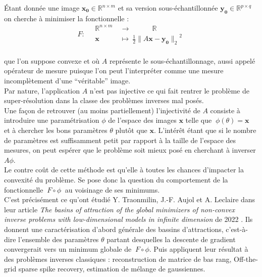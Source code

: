 \documentclass[hidelinks, french]{article} %
\newcommand{\R}{\mathbb{R}}
\newcommand{\lr}{\longrightarrow}
\renewcommand{\bf}[1]{\boldsymbol{#1}}
\theoremstyle{enonce}
\theoremstyle{special}
\theoremstyle{rq}
\theoremstyle{exo}
\theoremstyle{demo}
\begin{document}
Étant donnée une image $\bf{x_0}\in\R^{n\times m}$ et sa version sous-échantillonnée $\bf{y_0}\in\R^{p\times q}$ on cherche à minimiser la fonctionnelle :\begin{equation}\label{eq:F}
	F :\quad \begin{aligned}\R^{n\times m}\ &\lr\qquad\quad \R \\ \bf{x}\quad\ &\longmapsto\ \frac{1}{2}{\big\|A\bf{x}-\bf{y_0}\big\|_2}^2\end{aligned}\end{equation}
\\
que l'on suppose convexe et où $A$ représente le sous-échantillonnage, aussi appelé opérateur de mesure puisque l'on peut l'interpréter comme une mesure incomplètement d'une ``véritable'' image.
\\

Par nature, l'application $A$ n'est pas injective ce qui fait rentrer le problème de super-résolution dans la classe des problèmes inverses mal posés.
\\

Une façon de retrouver (au moins partiellement) l'injectivité de $A$ consiste à introduire une paramétrisation $\phi$ de l'espace des images $\bf{x}$ telle que $\ \phi(\theta)=\bf{x}\ $ et à chercher les bons paramètres $\theta$ plutôt que $\bf{x}$. L'intérêt étant que si le nombre de paramètres est suffisamment petit par rapport à la taille de l'espace des mesures, on peut espérer que le problème soit mieux posé en cherchant à inverser $A\phi$.
\\
Le contre coût de cette méthode est qu'elle à toutes les chances d'impacter la convexité du problème. Se pose donc la question du comportement de la fonctionnelle $\ F\circ\phi\ $ au voisinage de ses minimums.
\\
C'est précisément ce qu'ont étudié Y. Traonmilin, J.-F. Aujol et A. Leclaire  dans leur article \emph{The basins of attraction of the global minimizers of non-convex inverse problems with low-dimensional models in infinite dimension} de 2022 \cite{traonmilin_basins_2022}. Ils donnent une caractérisation d'abord générale des bassins d'attractions, c'est-à-dire l'ensemble des paramètres $\theta$ partant desquelles la descente de gradient convergerait vers un minimum globale de $\ F\circ\phi$. Puis appliquent leur résultat à des problèmes inverses classiques : reconstruction de matrice de bas rang, Off-the-grid sparse spike recovery, estimation de mélange de gaussiennes.
\\
\end{document}
